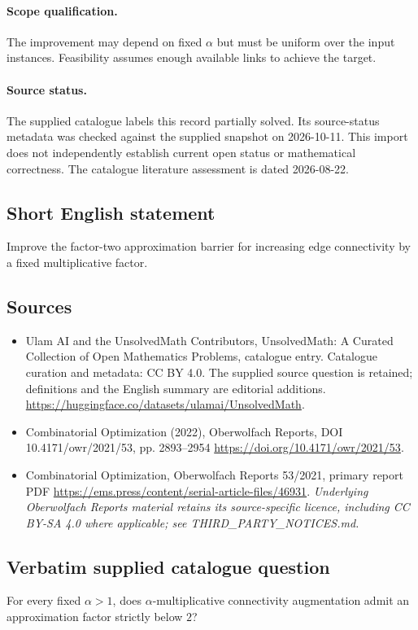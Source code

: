 \documentclass[11pt]{article}
\begin{document}
\paragraph{Scope qualification.}
The improvement may depend on fixed $\alpha$ but must be uniform over the input instances. Feasibility assumes enough available links to achieve the target.
\paragraph{Source status.}
The supplied catalogue labels this record partially solved. Its source-status metadata was checked against the supplied snapshot on 2026-10-11. This import does not independently establish current open status or mathematical correctness. The catalogue literature assessment is dated 2026-08-22.
\subsection{Short English statement}
Improve the factor-two approximation barrier for increasing edge connectivity by a fixed multiplicative factor.
\subsection{Sources}
\begin{itemize}
\item[S1] Ulam AI and the UnsolvedMath Contributors, UnsolvedMath: A Curated Collection of Open Mathematics Problems, catalogue entry. Catalogue curation and metadata: CC BY 4.0. The supplied source question is retained; definitions and the English summary are editorial additions.
\url{https://huggingface.co/datasets/ulamai/UnsolvedMath}.
\item[S2] Combinatorial Optimization (2022), Oberwolfach Reports, DOI 10.4171/owr/2021/53, pp. 2893--2954
\url{https://doi.org/10.4171/owr/2021/53}.
\item[S3] Combinatorial Optimization, Oberwolfach Reports 53/2021, primary report PDF
\url{https://ems.press/content/serial-article-files/46931}.
\textit{Underlying Oberwolfach Reports material retains its source-specific licence, including CC BY-SA 4.0 where applicable; see THIRD\_PARTY\_NOTICES.md.}
\end{itemize}
\subsection{Verbatim supplied catalogue question}
For every fixed $\alpha>1$, does $\alpha$-multiplicative connectivity augmentation admit an approximation factor strictly below $2$?
\end{document}
